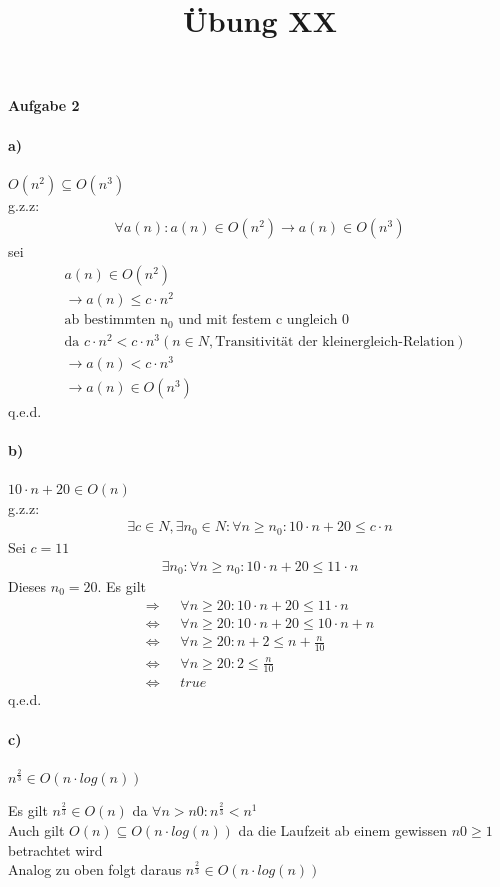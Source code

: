 \documentclass[a4paper,11pt]{scrartcl}
\title{Übung XX}
\begin{document}
\begin{center}
\LARGE{\textbf{Aufgabe 2}}
\end{center}
\paragraph{a)}$O(n^2)\subseteq O(n^3)$\\
g.z.z:
\begin{align*}
\forall a(n): a(n)\in O(n^2) \rightarrow a(n)\in O(n^3)
\end{align*}
sei 
\begin{align*}
&a(n)\in O(n^2)\\ &\rightarrow a(n)\leq c\cdot n^2 \\&\text{ab bestimmten n$_0$ und mit festem c ungleich 0}\\ &\text{da } c\cdot n^2 < c\cdot n^3 (n\in N, \text{Transitivität der kleinergleich-Relation})
\\ &\rightarrow a(n)<c\cdot n^3
\\ &\rightarrow a(n)\in O(n^3)
\end{align*}
q.e.d.
\paragraph{b)}$10\cdot n + 20 \in O(n)$ \\ g.z.z:
\begin{align*}
\exists c\in N, \exists n_0\in N: \forall n\geq n_0: 10\cdot n + 20 \leq c\cdot n
\end{align*}
Sei $c=11$
\begin{align*}
\exists n_0: \forall n\geq n_0: 10\cdot n +20 \leq 11\cdot n
\end{align*}
Dieses $n_0 = 20$. Es gilt
\begin{align*}
\Rightarrow\mbox{ }&\forall n\geq 20: 10\cdot n +20 \leq 11\cdot n\\
\Leftrightarrow\mbox{ }&\forall n\geq 20: 10\cdot n +20 \leq 10\cdot n + n\\
\Leftrightarrow\mbox{ }&\forall n\geq 20: n +2 \leq n + \frac{n}{10}\\
\Leftrightarrow\mbox{ }&\forall n\geq 20: 2 \leq \frac{n}{10}\\
\Leftrightarrow\mbox{ }&true
\end{align*}
q.e.d.
\paragraph{c)} $n^{\frac{2}{3}}\in O(n\cdot log(n))$\\ 
\begin{center}
Es gilt $n^{\frac{2}{3}} \in O(n)$ da $\forall n>n0:n^{\frac{2}{3}} < n^1$\\ Auch gilt $O(n)\subseteq O(n\cdot log(n))$ da die Laufzeit ab einem gewissen $n0\geq 1$ betrachtet wird  \\ Analog zu oben folgt daraus $n^{\frac{2}{3}}\in O(n\cdot log(n))$

\end{center}
\end{document}
